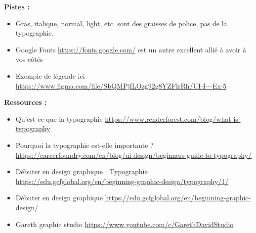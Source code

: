 \textbf{Pistes :}

\begin{itemize}
\item Gras, italique, normal, light, etc. sont des graisses de police, pas de la typographie.
\item Google Fonts \url{https://fonts.google.com/} est un autre excellent allié à avoir à vos côtés
\item Exemple de légende ici \url{https://www.figma.com/file/SbQMPjfLOzg92g8YZFlrRh/UI-I---Ex-5}
\end{itemize}

\textbf{Ressources :}

\begin{itemize}
\item Qu'est-ce que la typographie \url{https://www.renderforest.com/blog/what-is-typography}
\item Pourquoi la typographie est-elle importante ? \url{https://careerfoundry.com/en/blog/ui-design/beginners-guide-to-typography/}
\item Débuter en design graphique : Typographie \url{https://edu.gcfglobal.org/en/beginning-graphic-design/typography/1/}
\item Débuter en design graphique \url{https://edu.gcfglobal.org/en/beginning-graphic-design/}
\item Gareth graphic studio \url{https://www.youtube.com/c/GarethDavidStudio}
\end{itemize}

